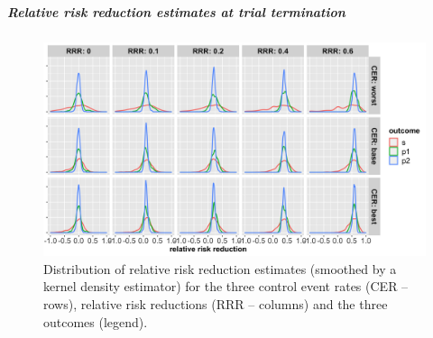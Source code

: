 \documentclass[]{article}
\let\oldsubparagraph\subparagraph
\renewcommand{\subparagraph}[1]{\oldsubparagraph{#1}\mbox{}}
\begin{document}
\clearpage

\hypertarget{relative-risk-reduction-estimates-at-trial-termination-2}{%
\subparagraph{Relative risk reduction estimates at trial
termination}\label{relative-risk-reduction-estimates-at-trial-termination-2}}

\begin{figure}
  \caption{Distribution of relative risk reduction estimates (smoothed by a kernel density estimator) for the three
  control event rates (CER – rows), relative risk reductions (RRR – columns) and the three outcomes (legend).}
  \includegraphics{../p1_plots/batch_size_nb_3000/RRRhat_p1.png}
\end{figure}
\end{document}
